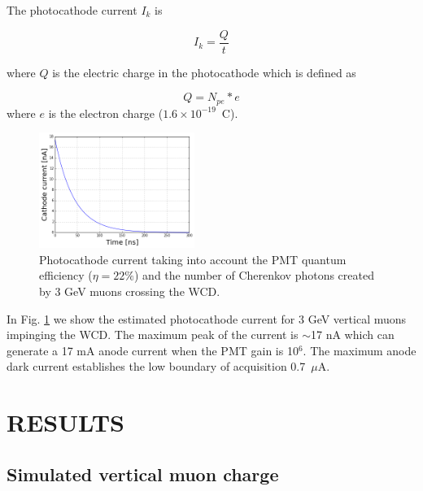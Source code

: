 \documentclass[letterpaper, 10 pt, conference]{ieeeconf}  %
\begin{document}

The photocathode current $I_k$ is 

\begin{equation}
I_k = \frac{Q}{t}
\end{equation}

where $Q$ is the electric charge in the photocathode which is defined as

\begin{equation}
Q = N_{pe}*e
\end{equation}
where $e$ is the electron charge ($1.6 \times 10^{-19}$~C). 

\begin{figure}[h!]
\begin{center}
\includegraphics[width=0.45\textwidth]{Figures/Cathode_current}
\caption{Photocathode current taking into account the PMT quantum efficiency ($\eta = 22 \%$) and the number of Cherenkov photons created by 3 GeV muons crossing the WCD.}
\label{cathode}
\end{center}
\end{figure}

In Fig. \ref{cathode} we show the estimated photocathode current for 3 GeV vertical muons impinging the WCD. The maximum peak of the current is $\sim$17 nA which can generate a 17 mA anode current when the PMT gain is 10$^6$. The maximum anode dark current establishes the low boundary of acquisition 0.7~$\mu$A.

\section{RESULTS}

\subsection{Simulated vertical muon charge}
\end{document}
